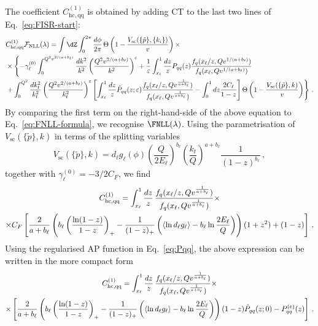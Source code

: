 The coefficient $C^{(1)}_{\mathrm{hc, qq}}$ is obtained by adding $\mathrm{CT}$ to the last two lines of Eq.~\eqref{eq:FISR-start}:
\begin{equation}
\begin{aligned}
  & C^{(1)}_{\rm hc,qq} \mathcal{F}_{\rm NLL}(\lambda)= \int \dZ \int_0^{2\pi}\frac{d\phi}{2\pi}\,\Theta\left(1-\frac{V_{\mathrm{sc}}(\{\tilde{p}\},\{k_i\})}{v}\right) \times \\ & \times \left\{ -\gamma_\ell^{(0)}\int_0^{Q^2v^{2/(a+b_\ell)}}\frac{dk^2}{k^2}\left(\frac{Q^2v^{2/(a+b_\ell)}}{k^2}\right)^{\varepsilon}+\frac{1}{\varepsilon} \int_{x_\ell}^1 \frac{dz}{z} P_{qq}(z) \frac{f_q(x_\ell/z,Q v^{1/(a+b_\ell)})}{f_q(x_\ell,Q v^{1/(a+b_\ell)})} \right. \\ 
   &\left. +\int_0^{Q^2}\frac{dk_t^2}{k_t^2}\left(\frac{Q^2v^{2/(a+b_\ell)}}{k_t^2}\right)^{\varepsilon} \left[\int_{x_\ell}^1\frac{dz}{z} \hat P_{qq}(z;\varepsilon)\frac{f_q(x_\ell/z,Qv^{\frac{1}{a+b_\ell}})}{f_q(x_\ell,Qv^{\frac{1}{a+b_\ell}})}-\int_0^1dz\frac{2 C_\ell}{1-z}\right]\Theta\left(1-\frac{V_{\mathrm{sc}}(\{\tilde{p}\},k)}{v}\right)\right\}\,.
\end{aligned}
\end{equation}
By comparing the first term on the right-hand-side of the above
equation to Eq.~\eqref{eq:FNLL-formula}, we recognise $\FNLL(\lambda)$. Using the parametrisation of
$V_{\mathrm{sc}}(\{\tilde{p}\},k)$ in terms of the splitting variables
\begin{equation}
\label{eq:Vsc-param}
V_{\mathrm{sc}}(\{\tilde{p}\},k)=d_\ell g_\ell(\phi) \left(\frac{Q}{2 E_\ell}\right)^{b_\ell}\left(\frac{k_t}{Q}\right)^{a+b_\ell}\frac{1}{(1-z)^{b_\ell}}\,,
\end{equation}
together with $\gamma_\ell^{(0)}=-3/2 C_F$, we find 
\begin{multline}
C^{(1)}_{\rm hc, qq}=  \int_{x_\ell}^1\frac{dz}{z}\,\frac{f_q(x_\ell/z,Qv^{\frac{1}{a+b_\ell}})}{f_q(x_\ell,Qv^{\frac{1}{a+b_\ell}})}\times \\ \times
C_F\left[\frac{2 }{a+b_\ell}\left(b_\ell\left(\frac{\ln(1-z)}{1-z}\right)_+-\frac{1}{(1-z)_+}
        \left(\langle\ln d_\ell g_\ell\rangle-b_\ell \ln\frac{2E_\ell}{Q}\right)\right)(1+z^2)+(1-z)\right]\,.
  \end{multline}
  Using the regularised AP function in Eq.~\eqref{eq:Pqq}, the above expression can be written in the more compact form
  \begin{multline}
    \label{eq:C1qq-final}
C^{(1)}_{\rm hc, qq}=  \int_{x_\ell}^1\frac{dz}{z}\,\frac{f_q(x_\ell/z,Qv^{\frac{1}{a+b_\ell}})}{f_q(x_\ell,Qv^{\frac{1}{a+b_\ell}})}\times \\ \times
\left[\frac{2 }{a+b_\ell}\left(b_\ell\left(\frac{\ln(1-z)}{1-z}\right)_+-\frac{1}{(1-z)_+}
        \left(\langle\ln d_\ell g_\ell\rangle-b_\ell \ln\frac{2E_\ell}{Q}\right)\right)(1-z)\hat P_{qq}(z;0)-P_{qq}^{(\varepsilon)}(z)\right]\,.
  \end{multline}
